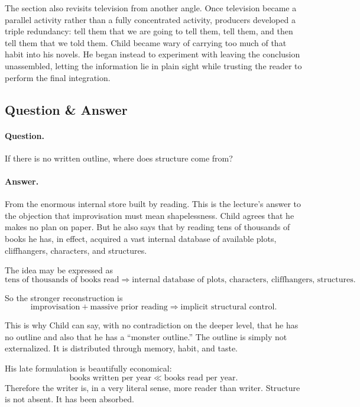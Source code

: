 The section also revisits television from another angle. Once television became a parallel activity rather than a fully concentrated activity, producers developed a triple redundancy: tell them that we are going to tell them, tell them, and then tell them that we told them. Child became wary of carrying too much of that habit into his novels. He began instead to experiment with leaving the conclusion unassembled, letting the information lie in plain sight while trusting the reader to perform the final integration.

\subsection{Question \& Answer}

\paragraph{Question.} If there is no written outline, where does structure come from?

\paragraph{Answer.} From the enormous internal store built by reading. This is the lecture's answer to the objection that improvisation must mean shapelessness. Child agrees that he makes no plan on paper. But he also says that by reading tens of thousands of books he has, in effect, acquired a vast internal database of available plots, cliffhangers, characters, and structures.

The idea may be expressed as
\begin{equation}
\text{tens of thousands of books read} \Longrightarrow \text{internal database of plots, characters, cliffhangers, structures}.
\end{equation}

So the stronger reconstruction is
\begin{equation}
\text{improvisation} + \text{massive prior reading} \Longrightarrow \text{implicit structural control}.
\end{equation}

This is why Child can say, with no contradiction on the deeper level, that he has no outline and also that he has a ``monster outline.'' The outline is simply not externalized. It is distributed through memory, habit, and taste.

His late formulation is beautifully economical:
\begin{equation}
\text{books written per year} \ll \text{books read per year}.
\end{equation}
Therefore the writer is, in a very literal sense, more reader than writer. Structure is not absent. It has been absorbed.

